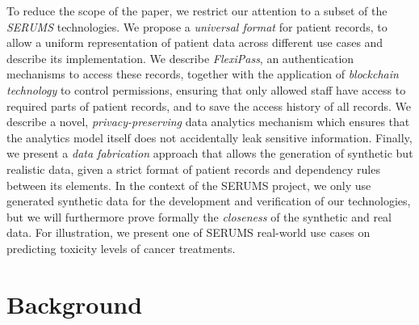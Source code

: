 To reduce the scope of the paper, we restrict our attention to a subset of the \emph{SERUMS} technologies. We propose a \emph{universal format} for patient records, to allow a uniform representation of patient data across different use cases and describe its implementation.
We describe \emph{FlexiPass}, an authentication mechanisms to access these records, together with the application of \emph{blockchain technology} to control permissions, ensuring that only allowed staff have access to required parts of patient records, 
and to save the access history of all records. We describe a novel, \emph{privacy-preserving} data analytics mechanism which ensures that the analytics model itself does not accidentally leak sensitive information. Finally, we present a \emph{data fabrication} approach that allows the generation
of synthetic but realistic data, given 
a strict format of patient records and dependency rules between its elements. In the context of the SERUMS project, we only use generated synthetic data for the development and verification of our technologies, but we will furthermore prove formally the \emph{closeness} of the synthetic and real data.
For illustration, we present one of SERUMS real-world use cases on predicting toxicity levels of cancer treatments. 




\section{Background}

